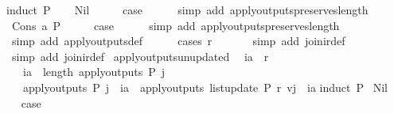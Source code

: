 \begin{isabellebody}
{\isacharparenleft}induct\ P{\isacharparenright}\isanewline
\ \ \isamarkupfalse%
\ Nil\isanewline
\ \ \isamarkupfalse%
\ \isamarkupfalse%
\ {\isacharquery}case\isanewline
\ \ \ \ \isamarkupfalse%
\ {\isacharparenleft}simp\ add{\isacharcolon}\ apply{\isacharunderscore}outputs{\isacharunderscore}preserves{\isacharunderscore}length{\isacharparenright}\isanewline
{}\isamarkupfalse%
\isanewline
\ \ \isamarkupfalse%
\ {\isacharparenleft}Cons\ a\ P{\isacharparenright}\isanewline
\ \ \isamarkupfalse%
\ \isamarkupfalse%
\ {\isacharquery}case\isanewline
\ \ \ \ \isamarkupfalse%
\ {\isacharparenleft}simp\ add{\isacharcolon}\ apply{\isacharunderscore}outputs{\isacharunderscore}preserves{\isacharunderscore}length{\isacharparenright}\isanewline
\ \ \ \ \isamarkupfalse%
\ {\isacharparenleft}simp\ add{\isacharcolon}\ apply{\isacharunderscore}outputs{\isacharunderscore}def{\isacharparenright}\isanewline
\ \ \ \ \isamarkupfalse%
\ {\isacharparenleft}cases\ r{\isacharparenright}\isanewline
\ \ \ \ \ \isamarkupfalse%
\ {\isacharparenleft}simp\ add{\isacharcolon}\ join{\isacharunderscore}ir{\isacharunderscore}def{\isacharparenright}\isanewline
\ \ \ \ \isamarkupfalse%
\ {\isacharparenleft}simp\ add{\isacharcolon}\ join{\isacharunderscore}ir{\isacharunderscore}def{\isacharparenright}\isanewline
{}\isamarkupfalse%
%
\endisatagproof
{\isafoldproof}%
%
\isadelimproof
\isanewline
%
\endisadelimproof
\isanewline
{}\isamarkupfalse%
\ apply{\isacharunderscore}outputs{\isacharunderscore}unupdated{\isacharcolon}\isanewline
\ \ {\isachardoublequoteopen}ia\ {\isasymnoteq}\ r\ {\isasymLongrightarrow}\ \isanewline
\ \ \ ia\ {\isacharless}\ length\ {\isacharparenleft}apply{\isacharunderscore}outputs\ P\ j{\isacharparenright}\ {\isasymLongrightarrow}\isanewline
\ \ \ apply{\isacharunderscore}outputs\ P\ j\ {\isacharbang}\ ia\ {\isacharequal}\ apply{\isacharunderscore}outputs\ {\isacharparenleft}list{\isacharunderscore}update\ P\ r\ v{\isacharparenright}j\ {\isacharbang}\ ia{\isachardoublequoteclose}\isanewline
%
\isadelimproof
%
\endisadelimproof
%
\isatagproof
{}\isamarkupfalse%
{\isacharparenleft}induct\ P{\isacharparenright}\isanewline
{}\isamarkupfalse%
\ Nil\isanewline
\ \ \isamarkupfalse%
\ \isamarkupfalse%
\ {\isacharquery}case\isanewline
\ \ \ \ \isamarkupfalse%

\end{isabellebody}
